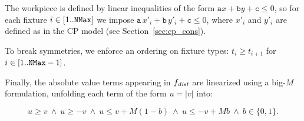 The workpiece is defined by linear inequalities of the form $\mathtt{a}x + \mathtt{b}y + \mathtt{c} \leq 0$, so for each fixture \(i \in [1..\mathtt{NMax}]\) we impose \(\mathtt{a}\,x'_i + \mathtt{b}\,y'_i + \mathtt{c} \leq 0\), where \(x'_i\) and \(y'_i\) are defined as in the CP model (see Section~\ref{sec:cp_cons}).

To break symmetries, we enforce an ordering on fixture types: $t_i \ge t_{i+1}$ for $i \in [1..\mathtt{NMax}-1]$.

Finally, the absolute value terms appearing in \(f_\mathit{dist}\) are linearized using a big-\(M\) formulation, unfolding each term of the form \(u=|v|\) into: 

$$u \ge v ~\wedge~ u \ge -v ~\wedge~ u \leq v + M (1 - b)  ~\wedge~ u \leq -v + M b~\wedge~ b\in\{0,1\}.$$